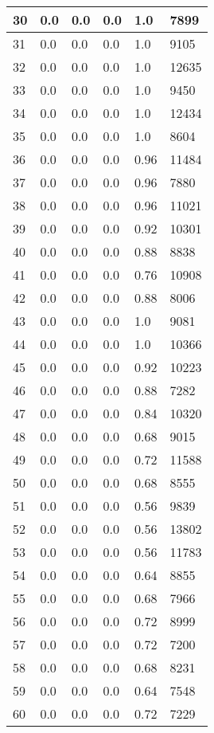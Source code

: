 \begin{longtable}{|l|l|l|l|l|l|}
30 & 0.0 & 0.0 & 0.0 & 1.0 & 7899 \\ \hline 
31 & 0.0 & 0.0 & 0.0 & 1.0 & 9105 \\ \hline 
32 & 0.0 & 0.0 & 0.0 & 1.0 & 12635 \\ \hline 
33 & 0.0 & 0.0 & 0.0 & 1.0 & 9450 \\ \hline 
34 & 0.0 & 0.0 & 0.0 & 1.0 & 12434 \\ \hline 
35 & 0.0 & 0.0 & 0.0 & 1.0 & 8604 \\ \hline 
36 & 0.0 & 0.0 & 0.0 & 0.96 & 11484 \\ \hline 
37 & 0.0 & 0.0 & 0.0 & 0.96 & 7880 \\ \hline 
38 & 0.0 & 0.0 & 0.0 & 0.96 & 11021 \\ \hline 
39 & 0.0 & 0.0 & 0.0 & 0.92 & 10301 \\ \hline 
40 & 0.0 & 0.0 & 0.0 & 0.88 & 8838 \\ \hline 
41 & 0.0 & 0.0 & 0.0 & 0.76 & 10908 \\ \hline 
42 & 0.0 & 0.0 & 0.0 & 0.88 & 8006 \\ \hline 
43 & 0.0 & 0.0 & 0.0 & 1.0 & 9081 \\ \hline 
44 & 0.0 & 0.0 & 0.0 & 1.0 & 10366 \\ \hline 
45 & 0.0 & 0.0 & 0.0 & 0.92 & 10223 \\ \hline 
46 & 0.0 & 0.0 & 0.0 & 0.88 & 7282 \\ \hline 
47 & 0.0 & 0.0 & 0.0 & 0.84 & 10320 \\ \hline 
48 & 0.0 & 0.0 & 0.0 & 0.68 & 9015 \\ \hline 
49 & 0.0 & 0.0 & 0.0 & 0.72 & 11588 \\ \hline 
50 & 0.0 & 0.0 & 0.0 & 0.68 & 8555 \\ \hline 
51 & 0.0 & 0.0 & 0.0 & 0.56 & 9839 \\ \hline 
52 & 0.0 & 0.0 & 0.0 & 0.56 & 13802 \\ \hline 
53 & 0.0 & 0.0 & 0.0 & 0.56 & 11783 \\ \hline 
54 & 0.0 & 0.0 & 0.0 & 0.64 & 8855 \\ \hline 
55 & 0.0 & 0.0 & 0.0 & 0.68 & 7966 \\ \hline 
56 & 0.0 & 0.0 & 0.0 & 0.72 & 8999 \\ \hline 
57 & 0.0 & 0.0 & 0.0 & 0.72 & 7200 \\ \hline 
58 & 0.0 & 0.0 & 0.0 & 0.68 & 8231 \\ \hline 
59 & 0.0 & 0.0 & 0.0 & 0.64 & 7548 \\ \hline 
60 & 0.0 & 0.0 & 0.0 & 0.72 & 7229 \\ \hline 

\end{longtable}
